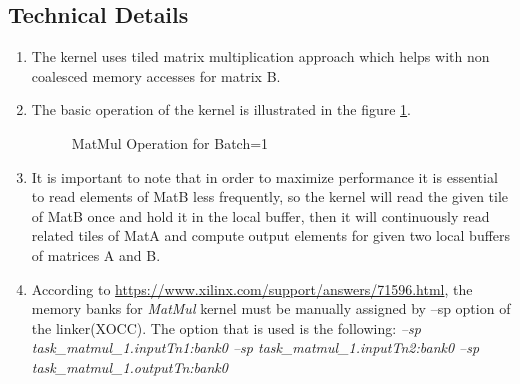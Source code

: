 \documentclass[•]{article}
\begin{document}
\subsection{Technical Details}
\begin{enumerate}
\item The kernel uses tiled matrix multiplication approach which helps with non coalesced memory accesses for matrix B.
\item The basic operation of the kernel is illustrated in the figure \ref{fig:matmul01}.

\begin{figure}[h] 
\caption{MatMul Operation for Batch=1}
\label{fig:matmul01}
\centering
{}
\end{figure}


\item It is important to note that in order to maximize performance it is essential to read elements of MatB less frequently, so the kernel will read the given tile of MatB once and hold it in the local buffer, then it will continuously read related tiles of MatA and compute output elements for given two local buffers of matrices A and B. 

\item According to \url{https://www.xilinx.com/support/answers/71596.html}, the memory banks for \emph{MatMul} kernel must be manually assigned by --sp option of the linker(XOCC). The option that is used is the following: \emph{--sp task\_matmul\_1.inputTn1:bank0 --sp task\_matmul\_1.inputTn2:bank0 --sp task\_matmul\_1.outputTn:bank0}
\end{enumerate}
\end{document}
